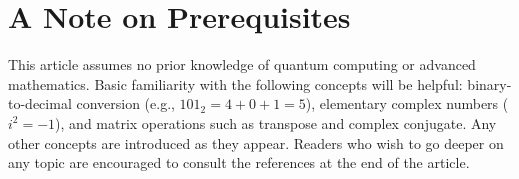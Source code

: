 \section{A Note on Prerequisites}

This article assumes no prior knowledge of quantum computing or advanced
mathematics. Basic familiarity with the following concepts will be helpful:
binary-to-decimal conversion (e.g., $101_2 = 4 + 0 + 1 = 5$), elementary
complex numbers ($i^2 = -1$), and matrix operations such as transpose and
complex conjugate. Any other concepts are introduced as they appear. Readers
who wish to go deeper on any topic are encouraged to consult the references
at the end of the article.